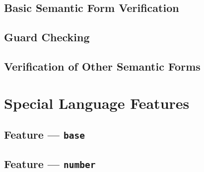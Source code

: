 
\subsection{Basic Semantic Form Verification} %
\label{sub:basic_semantic_form_verification}


\subsection{Guard Checking} %
\label{sub:guard_checking}


\subsection{Verification of Other Semantic Forms} %
\label{sub:verification_of_other_semantic_forms}



\section{Special Language Features} %
\label{sec:special_language_features}

\subsection{Feature --- \texttt{base}} %
\label{sub:feature_base}


\subsection{Feature --- \texttt{number}} %
\label{sub:feature_number}

